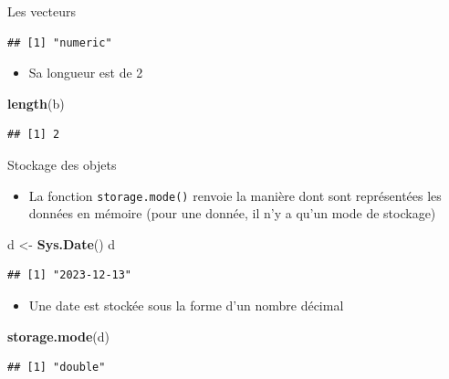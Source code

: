 \documentclass[
  ignorenonframetext,
]{beamer}
\newenvironment{Shaded}{\begin{snugshade}}{\end{snugshade}}
\newcommand{\FunctionTok}[1]{\textcolor[rgb]{0.13,0.29,0.53}{\textbf{#1}}}
\newcommand{\NormalTok}[1]{#1}
\newcommand{\OtherTok}[1]{\textcolor[rgb]{0.56,0.35,0.01}{#1}}
\providecommand{\tightlist}{%
  \setlength{\itemsep}{0pt}\setlength{\parskip}{0pt}}
\begin{document}
\begin{frame}[fragile]{Les vecteurs}
\begin{verbatim}
## [1] "numeric"
\end{verbatim}

\normalsize

\begin{itemize}
\tightlist
\item
  Sa longueur est de 2
\end{itemize}

\tiny

\begin{Shaded}
\begin{Highlighting}[]
\FunctionTok{length}\NormalTok{(b)}
\end{Highlighting}
\end{Shaded}

\begin{verbatim}
## [1] 2
\end{verbatim}

\normalsize
\end{frame}

\begin{frame}[fragile]{Stockage des objets}
\protect\hypertarget{stockage-des-objets}{}
\begin{itemize}
\tightlist
\item
  La fonction \texttt{storage.mode()} renvoie la manière dont sont
  représentées les données en mémoire (pour une donnée, il n'y a qu'un
  mode de stockage)
\end{itemize}

\tiny

\begin{Shaded}
\begin{Highlighting}[]
\NormalTok{d }\OtherTok{\textless{}{-}} \FunctionTok{Sys.Date}\NormalTok{()}
\NormalTok{d}
\end{Highlighting}
\end{Shaded}

\begin{verbatim}
## [1] "2023-12-13"
\end{verbatim}

\normalsize

\begin{itemize}
\tightlist
\item
  Une date est stockée sous la forme d'un nombre décimal
\end{itemize}

\tiny

\begin{Shaded}
\begin{Highlighting}[]
\FunctionTok{storage.mode}\NormalTok{(d)}
\end{Highlighting}
\end{Shaded}

\begin{verbatim}
## [1] "double"
\end{verbatim}

\normalsize
\end{frame}
\end{document}
